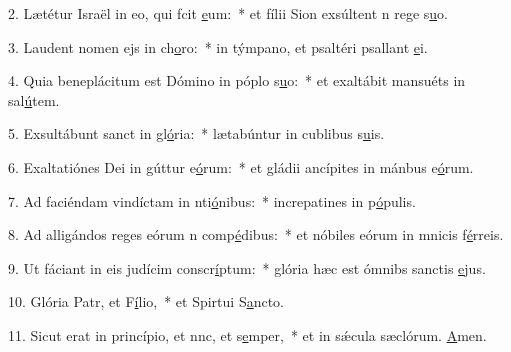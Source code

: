 2. Lætétur Israël in eo, qui fcit \uline{e}um:~* et fílii Sion exsúltent n rege s\uline{u}o.\par 
3. Laudent nomen ejs in ch\uline{o}ro:~* in týmpano, et psaltéri psallant \uline{e}i.\par 
4. Quia beneplácitum est Dómino in póplo s\uline{u}o:~* et exaltábit mansuéts in sal\uline{ú}tem.\par 
5. Exsultábunt sanct in gl\uline{ó}ria:~* lætabúntur in cublibus s\uline{u}is.\par 
6. Exaltatiónes Dei in gúttur e\uline{ó}rum:~* et gládii ancípites in mánbus e\uline{ó}rum.\par 
7. Ad faciéndam vindíctam in nti\uline{ó}nibus:~* increpatines in p\uline{ó}pulis.\par 
8. Ad alligándos reges eórum n comp\uline{é}dibus:~* et nóbiles eórum in mnicis f\uline{é}rreis.\par 
9. Ut fáciant in eis judícim conscr\uline{í}ptum:~* glória hæc est ómnibs sanctis \uline{e}jus.\par 
10. Glória Patr, et F\uline{í}lio,~* et Spirtui S\uline{a}ncto.\par 
11. Sicut erat in princípio, et nnc, et s\uline{e}mper,~* et in sǽcula sæclórum. \uline{A}men.\par 
